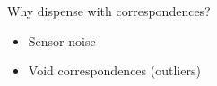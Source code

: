 \begin{frame}[noframenumbering]{Why dispense with correspondences?}

\begin{overlayarea}{\textwidth}{3cm}
\leavevmode
  \begin{itemize}
    \item Sensor noise
    \item Void correspondences (outliers)
  \end{itemize}

\end{overlayarea}

\end{frame}
